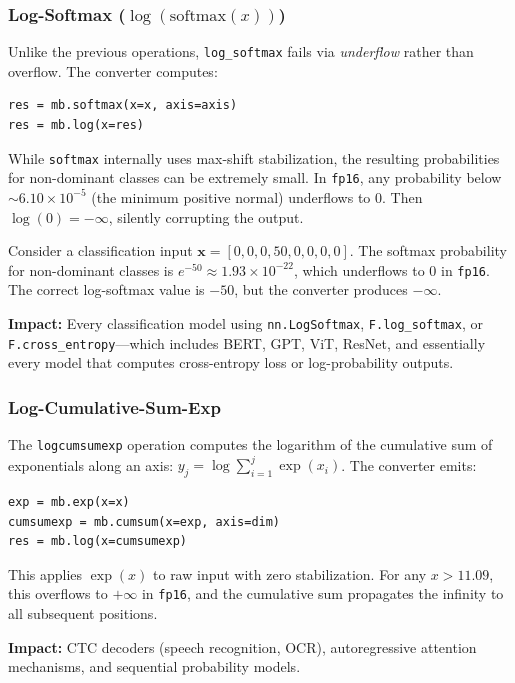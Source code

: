 \documentclass[10pt,twocolumn]{article}
\newcommand{\fp}{\texttt{fp16}}
\begin{document}
\subsubsection{\texorpdfstring{Log-Softmax ($\log(\text{softmax}(x))$)}{Log-Softmax}}
\label{sec:logsoftmax}

Unlike the previous operations, \texttt{log\_softmax} fails via
\emph{underflow} rather than overflow.  The converter computes:
\begin{lstlisting}
res = mb.softmax(x=x, axis=axis)
res = mb.log(x=res)
\end{lstlisting}

While \texttt{softmax} internally uses max-shift stabilization, the
resulting probabilities for non-dominant classes can be extremely
small.  In \fp{}, any probability below
$\sim 6.10 \times 10^{-5}$ (the minimum positive normal) underflows
to 0.  Then $\log(0) = -\infty$, silently corrupting the output.

Consider a classification input
$\mathbf{x} = [0, 0, 0, 50, 0, 0, 0, 0]$.  The softmax probability
for non-dominant classes is $e^{-50} \approx 1.93 \times 10^{-22}$,
which underflows to 0 in \fp{}.  The correct log-softmax value is
$-50$, but the converter produces $-\infty$.

\textbf{Impact:} Every classification model using \texttt{nn.LogSoftmax},
\texttt{F.log\_softmax}, or \texttt{F.cross\_entropy}---which includes BERT,
GPT, ViT, ResNet, and essentially every model that computes cross-entropy loss
or log-probability outputs.

\subsubsection{Log-Cumulative-Sum-Exp}
\label{sec:logcumsumexp}

The \texttt{logcumsumexp} operation computes the logarithm of the
cumulative sum of exponentials along an axis:
$y_j = \log \sum_{i=1}^{j} \exp(x_i)$.  The converter emits:
\begin{lstlisting}
exp = mb.exp(x=x)
cumsumexp = mb.cumsum(x=exp, axis=dim)
res = mb.log(x=cumsumexp)
\end{lstlisting}

This applies $\exp(x)$ to raw input with zero stabilization.  For
any $x > 11.09$, this overflows to $+\infty$ in \fp{}, and the
cumulative sum propagates the infinity to all subsequent positions.

\textbf{Impact:} CTC decoders (speech recognition, OCR), autoregressive
attention mechanisms, and sequential probability models.
\end{document}
